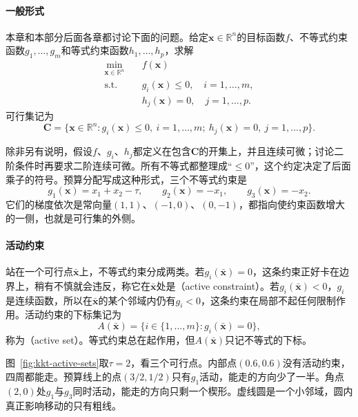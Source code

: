 \paragraph{一般形式}
本章和本部分后面各章都讨论下面的问题。给定$\bm{x}\in\mathbb{R}^n$的目标函数$f$、不等式约束函数$g_1,\ldots,g_m$和等式约束函数$h_1,\ldots,h_p$，求解
\begin{equation}
 \begin{aligned}
  \min_{\bm{x}\in\mathbb{R}^n}\quad&f(\bm{x})\\
  \text{s.t.}\quad&g_i(\bm{x})\leq0,\quad i=1,\ldots,m,\\
  &h_j(\bm{x})=0,\quad j=1,\ldots,p.
 \end{aligned}
 \label{eq:kkt-problem}
\end{equation}
可行集记为
\begin{equation}
 \bm{C}=\{\bm{x}\in\mathbb{R}^n:g_i(\bm{x})\leq0,\ i=1,\ldots,m;\ h_j(\bm{x})=0,\ j=1,\ldots,p\}.
 \label{eq:kkt-feasible}
\end{equation}

除非另有说明，假设$f$、$g_i$、$h_j$都定义在包含$\bm{C}$的开集上，并且连续可微；讨论二阶条件时再要求二阶连续可微。所有不等式都整理成“$\leq0$”，这个约定决定了后面乘子的符号。预算分配写成这种形式，三个不等式约束是
\begin{equation}
 g_1(\bm{x})=x_1+x_2-\tau,\qquad g_2(\bm{x})=-x_1,\qquad g_3(\bm{x})=-x_2.
 \label{eq:kkt-budget-constraints}
\end{equation}
它们的梯度依次是常向量$(1,1)$、$(-1,0)$、$(0,-1)$，都指向使约束函数增大的一侧，也就是可行集的外侧。

\paragraph{活动约束}
站在一个可行点$\bar{\bm{x}}$上，不等式约束分成两类。若$g_i(\bar{\bm{x}})=0$，这条约束正好卡在边界上，稍有不慎就会违反，称它在$\bar{\bm{x}}$处是（active constraint）。若$g_i(\bar{\bm{x}})<0$，$g_i$是连续函数，所以在$\bar{\bm{x}}$的某个邻域内仍有$g_i<0$，这条约束在局部不起任何限制作用。活动约束的下标集记为
\begin{equation}
 A(\bar{\bm{x}})=\{i\in\{1,\ldots,m\}:g_i(\bar{\bm{x}})=0\},
 \label{eq:kkt-active-set}
\end{equation}
称为（active set）。等式约束总在起作用，但$A(\bar{\bm{x}})$只记不等式的下标。

图~\ref{fig:kkt-active-sets}取$\tau=2$，看三个可行点。内部点$(0.6,0.6)$没有活动约束，四周都能走。预算线上的点$(3/2,1/2)$只有$g_1$活动，能走的方向少了一半。角点$(2,0)$处$g_1$与$g_3$同时活动，能走的方向只剩一个楔形。虚线圆是一个小邻域，圆内真正影响移动的只有粗线。

